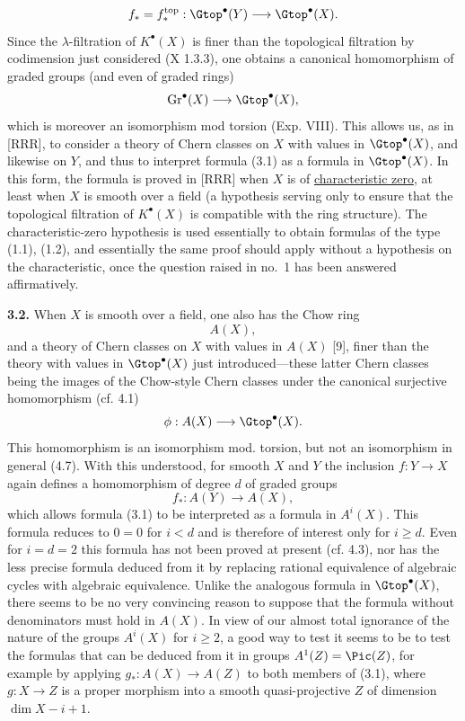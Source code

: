 \[
 f_*=f_*^{\mathrm{top}}:\Gtop^\bullet(Y)\longrightarrow \Gtop^\bullet(X).
\]
Since the $\lambda$-filtration of $K^\bullet(X)$ is finer than the topological filtration by codimension just considered (X 1.3.3), one obtains a canonical homomorphism of graded groups (and even of graded rings)
\[
 \operatorname{Gr}^\bullet(X)\longrightarrow \Gtop^\bullet(X),
\]
which is moreover an isomorphism mod torsion (Exp. VIII). This allows us, as in [RRR], to consider a theory of Chern classes on $X$ with values in $\Gtop^\bullet(X)$, and likewise on $Y$, and thus to interpret formula (3.1) as a formula in $\Gtop^\bullet(X)$. In this form, the formula is proved in [RRR] when $X$ is of \uline{characteristic zero}, at least when $X$ is smooth over a field (a hypothesis serving only to ensure that the topological filtration of $K^\bullet(X)$ is compatible with the ring structure). The characteristic-zero hypothesis is used essentially
%
to obtain formulas of the type (1.1), (1.2), and essentially the same proof should apply without a hypothesis on the characteristic, once the question raised in no.~1 has been answered affirmatively.

\textbf{3.2.} When $X$ is smooth over a field, one also has the Chow ring
\[
 A(X),
\]
and a theory of Chern classes on $X$ with values in $A(X)$ [9], finer than the theory with values in $\Gtop^\bullet(X)$ just introduced---these latter Chern classes being the images of the Chow-style Chern classes under the canonical surjective homomorphism (cf. 4.1)
\[
 \phi:A(X)\longrightarrow \Gtop^\bullet(X).
\]
This homomorphism is an isomorphism mod. torsion, but not an isomorphism in general (4.7). With this understood, for smooth $X$ and $Y$ the inclusion $f:Y\to X$ again defines a homomorphism of degree $d$ of graded groups
\[
 f_*:A(Y)\longrightarrow A(X),
\]
which allows formula (3.1) to be interpreted as a formula in $A^i(X)$. This formula reduces to $0=0$ for $i<d$ and is therefore of interest only for $i\geq d$. Even for $i=d=2$ this formula has not been proved at present (cf. 4.3), nor has the less precise formula deduced from it by replacing rational equivalence of algebraic cycles with algebraic equivalence. Unlike the analogous formula in $\Gtop^\bullet(X)$, there seems to be no very convincing reason to suppose that the formula without denominators must hold in $A(X)$. In view of our almost total ignorance of the nature of the groups $A^i(X)$ for $i\geq 2$, a good way to test it seems to be to test the formulas that can be deduced from it in groups $A^1(Z)=\Pic(Z)$, for example by applying $g_*:A(X)\longrightarrow A(Z)$ to both members of (3.1), where $g:X\to Z$ is a proper morphism into a smooth quasi-projective $Z$ of dimension $\dim X-i+1$.

